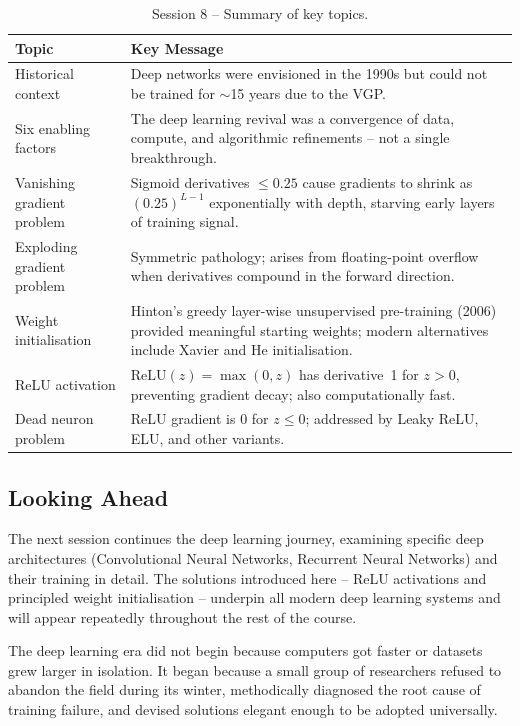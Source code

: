 \documentclass[12pt,a4paper]{article}
\newcommand{\relu}{\mathrm{ReLU}}
\begin{document}
\begin{table}[htbp]
\centering
\caption{Session 8 -- Summary of key topics.}
\label{tab:summary}
\begin{tabular}{@{}p{4.2cm}p{9cm}@{}}
\toprule
\textbf{Topic} & \textbf{Key Message} \\
\midrule
Historical context
  & Deep networks were envisioned in the 1990s but could not be
    trained for $\sim$15 years due to the VGP. \\[4pt]
Six enabling factors
  & The deep learning revival was a convergence of data, compute,
    and algorithmic refinements -- not a single breakthrough. \\[4pt]
Vanishing gradient problem
  & Sigmoid derivatives $\leq 0.25$ cause gradients to shrink as
    $(0.25)^{L-1}$ exponentially with depth, starving early layers
    of training signal. \\[4pt]
Exploding gradient problem
  & Symmetric pathology; arises from floating-point overflow when
    derivatives compound in the forward direction. \\[4pt]
Weight initialisation
  & Hinton's greedy layer-wise unsupervised pre-training (2006)
    provided meaningful starting weights; modern alternatives
    include Xavier and He initialisation. \\[4pt]
ReLU activation
  & $\relu(z) = \max(0,z)$ has derivative~1 for $z>0$, preventing
    gradient decay; also computationally fast. \\[4pt]
Dead neuron problem
  & ReLU gradient is 0 for $z \leq 0$; addressed by Leaky ReLU,
    ELU, and other variants. \\
\bottomrule
\end{tabular}
\end{table}

\subsection{Looking Ahead}
\label{subsec:looking_ahead}

The next session continues the deep learning journey, examining
specific deep architectures (Convolutional Neural Networks, Recurrent
Neural Networks) and their training in detail.  The solutions
introduced here -- ReLU activations and principled weight
initialisation -- underpin all modern deep learning systems and will
appear repeatedly throughout the rest of the course.

\begin{keyinsight}
The deep learning era did not begin because computers got faster or
datasets grew larger in isolation.  It began because a small group of
researchers refused to abandon the field during its winter,
methodically diagnosed the root cause of training failure, and devised
solutions elegant enough to be adopted universally.
\end{keyinsight}
\end{document}
